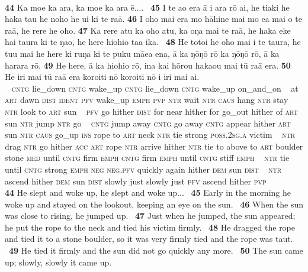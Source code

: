 {~

\bigskip\gll
\textbf{\textup{44}} Ka moe ka {\ꞌ}ara, ka moe ka {\ꞌ}ara ē.... ~\textbf{\textup{45}} {\ꞌ}I te {\ꞌ}ao era {\ꞌ}ā i {\ꞌ}ara rō ai, he tiaki he haka tau he noho he u{\ꞌ}i ki te ra{\ꞌ}ā. \textbf{\textup{46}} I oho mai era mo hāhine mai mo e{\ꞌ}a mai o te ra{\ꞌ}ā, he rere he oho. \textbf{\textup{47}} Ka rere atu ka oho atu, ka oŋa mai te ra{\ꞌ}ā, he haka eke hai taura ki te ŋao, he here hiohio ta{\ꞌ}a ika. ~\textbf{\textup{48}} He totoi he oho mai i te taura, he tu{\ꞌ}u mai he here ki ruŋa ki te puku mā{\ꞌ}ea ena, {\ꞌ}ā ka ŋōŋō rō ka ŋōŋō rō, {\ꞌ}ā ka harara rō. \textbf{\textup{49}} He here, {\ꞌ}ā ka hiohio rō, {\ꞌ}ina kai hōrou haka{\ꞌ}ou mai tū ra{\ꞌ}ā era. \textbf{\textup{50}} He iri mai tū ra{\ꞌ}ā era koro{\ꞌ}iti nō koro{\ꞌ}iti nō i iri mai ai.\\
~ \textsc{cntg} lie\_down \textsc{cntg} wake\_up \textsc{cntg} lie\_down \textsc{cntg} wake\_up on\_and\_on ~ at \textsc{art} dawn \textsc{dist} \textsc{ident} \textsc{pfv} wake\_up \textsc{emph} \textsc{pvp} \textsc{ntr} wait \textsc{ntr} \textsc{caus} hang \textsc{ntr} stay \textsc{ntr} look to \textsc{art} sun  ~ \textsc{pfv} go hither \textsc{dist} for near hither for go\_out hither of \textsc{art} sun \textsc{ntr} jump \textsc{ntr} go  ~ \textsc{cntg} jump away \textsc{cntg} go away \textsc{cntg} appear hither \textsc{art} sun \textsc{ntr} \textsc{caus} go\_up \textsc{ins} rope to \textsc{art} neck \textsc{ntr} tie strong \textsc{poss.2sg.a} victim ~ \textsc{ntr} drag \textsc{ntr} go hither \textsc{acc} \textsc{art} rope \textsc{ntr} arrive hither \textsc{ntr} tie to above to \textsc{art} boulder stone \textsc{med} until \textsc{cntg} firm \textsc{emph} \textsc{cntg} firm \textsc{emph} until \textsc{cntg} stiff \textsc{emph} ~ \textsc{ntr} tie until \textsc{cntg} strong \textsc{emph} \textsc{neg} \textsc{neg.pfv} quickly again hither \textsc{dem} sun \textsc{dist}  ~ \textsc{ntr} ascend hither \textsc{dem} sun \textsc{dist} slowly just slowly just \textsc{pfv} ascend hither \textsc{pvp}\\

\medskip\glt
\textbf{\textup{44}} He slept and woke up, he slept and woke up... ~\textbf{\textup{45}} Early in the morning he woke up and stayed on the lookout, keeping an eye on the sun. ~\textbf{\textup{46}} When the sun was close to rising, he jumped up. ~\textbf{\textup{47}} Just when he jumped, the sun appeared; he put the rope to the neck and tied his victim firmly. ~\textbf{\textup{48}} He dragged the rope and tied it to a stone boulder, so it was very firmly tied and the rope was taut. ~\textbf{\textup{49}} He tied it firmly and the sun did not go quickly any more. ~\textbf{\textup{50}} The sun came up; slowly, slowly it came up.


}
